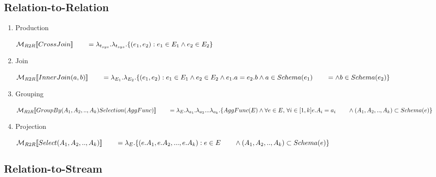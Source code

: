 \subsection*{Relation-to-Relation}
\begin{enumerate}
		
	\item Production
	
	$\mathcal{M}_{R2R}[\![CrossJoin]\!] \\
		{}\qquad= \lambda_{t_{sys}}.\lambda_{t_{sys}}.\{(e_1,e_2) : e_1 \in E_1 \land e_2 \in E_2 \}$
		
	\item Join
	
	$\mathcal{M}_{R2R}[\![InnerJoin(a,b)]\!] \\
		{}\qquad= \lambda_{E_1}.\lambda_{E_2}.\{(e_1,e_2) : e_1 \in E_1 \land e_2 \in E_2 \land e_1.a = e_2.b \land a \in Schema(e_1) \\
		{}\qquad= \land b \in Schema(e_2) \}$
		
	\item Grouping
	
		$\mathcal{M}_{R2R}[\![GroupBy(A_1,A_2,..,A_k) Selection(AggFunc)]\!] \\
		{}\qquad= \lambda_E.\lambda_{a_1}.\lambda_{a_2}...\lambda_{a_k}.\{AggFunc(E)  \land  \forall e \in E, \,\forall i \in [1,k] e.A_i= a_i \, \\
		{}\qquad\land (A_1,A_2,..,A_k) \subset Schema(e) \}$ 
	
	\item Projection
	
		$\mathcal{M}_{R2R}[\![Select(A_1,A_2,..,A_k)]\!] \\
		{}\qquad= \lambda_E.\{(e.A_1,e.A_2,...,e.A_k):e \in E \\
		{}\qquad\land (A_1,A_2,..,A_k) \subset Schema(e) \}$
	
\end{enumerate}

\subsection*{Relation-to-Stream}



